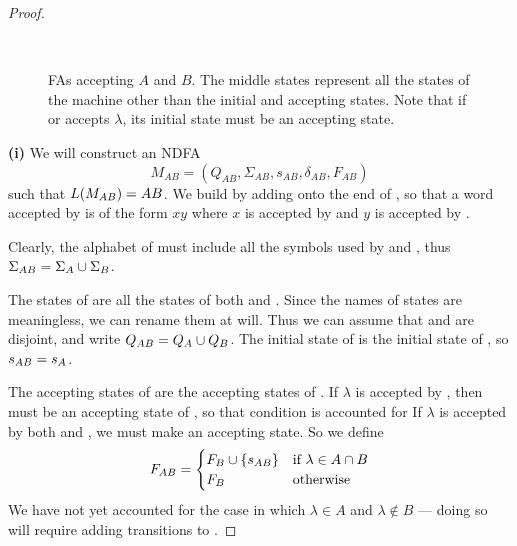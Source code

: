\documentclass{bcthesis}
\begin{document}
\begin{proof}
		\begin{figure}[H]
			\centering
			\\
			\caption{
			FAs accepting $A$ and $B$.
			The middle states represent all the states of the machine other than the initial and accepting states.
			Note that if \ma or \mb accepts $\lambda$, its initial state must be an accepting state.
			}
			\label{fig:ma_and_mb}
		\end{figure}

		\noindent \textbf{(i)} \hspace{\parindent}
		We will construct an NDFA 
		\[
			M_{AB} = (Q_{AB}, \Sigma_{AB}, s_{AB}, \delta_{AB}, F_{AB})
		\]
		such that $L(M_{AB}) = AB$.
		We build \mab by adding \mb onto the end of \ma, so that a word accepted by \mab is of the form $xy$ where $x$ is accepted by \ma and $y$ is accepted by \mb.

		Clearly, the alphabet of \mab must include all the symbols used by \ma and \mb, thus $\Sigma_{AB} = \Sigma_A \cup \Sigma_B$.
		
		The states of \mab are all the states of both \ma and \mb.
		Since the names of states are meaningless, we can rename them at will. 
		Thus we can assume that \qa and \qb are disjoint, and write $Q_{AB} = Q_A \cup Q_B$.
		The initial state of \mab is the initial state of \ma, so $s_{AB} = s_A$.

		The accepting states of \mab are the accepting states of \mb.
		If $\lambda$ is accepted by \mb, then \sb must be an accepting state of \mb, so that condition is accounted for
		If $\lambda$ is accepted by both \ma and \mb, we must make \sab an accepting state.
		So we define
		\[
			F_{AB} = 	\begin{cases}
						F_B \cup \{ s_{AB} \} &\text{if } \lambda \in A \cap B \\
						F_B &\text{otherwise}
					\end{cases}
		\]
		We have not yet accounted for the case in which $\lambda \in A$ and $\lambda \notin B$ --- doing so will require adding transitions to \mab.


\end{proof}
\end{document}
